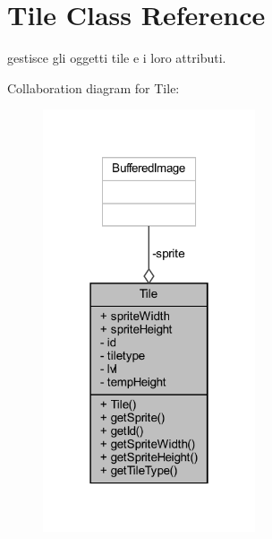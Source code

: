\hypertarget{classobjects_1_1_tile}{}\section{Tile Class Reference}
\label{classobjects_1_1_tile}


gestisce gli oggetti tile e i loro attributi.  




Collaboration diagram for Tile\+:\nopagebreak
\begin{figure}[H]
\begin{center}
\leavevmode
\includegraphics[width=178pt]{classobjects_1_1_tile__coll__graph}
\end{center}
\end{figure}
